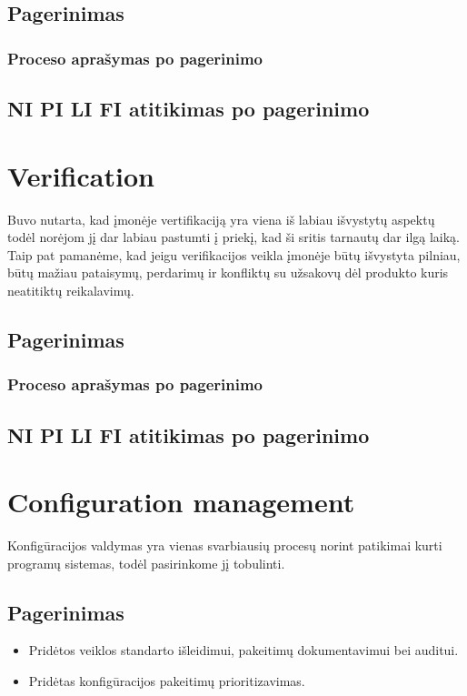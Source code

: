 \documentclass{VUMIFPSkursinis}
\begin{document}
		\subsection{Pagerinimas}
			\subsubsection{Proceso aprašymas po pagerinimo}
		\subsection{NI PI LI FI atitikimas po pagerinimo}
	\section{Verification}
		Buvo nutarta, kad įmonėje vertifikaciją yra viena iš labiau išvystytų aspektų todėl norėjom jį dar labiau pastumti į priekį, kad ši sritis tarnautų dar ilgą laiką. 
		Taip pat pamanėme, kad jeigu verifikacijos veikla įmonėje būtų išvystyta pilniau, būtų mažiau pataisymų, perdarimų ir konfliktų su užsakovų dėl produkto kuris neatitiktų reikalavimų.
		\subsection{Pagerinimas}
			\subsubsection{Proceso aprašymas po pagerinimo}
		\subsection{NI PI LI FI atitikimas po pagerinimo}
	\section{Configuration management}
	Konfigūracijos valdymas yra vienas svarbiausių procesų norint patikimai kurti programų sistemas, todėl pasirinkome jį tobulinti.
		\subsection{Pagerinimas}
		\begin{itemize}
			\item Pridėtos veiklos standarto išleidimui, pakeitimų dokumentavimui bei auditui.
			\item Pridėtas konfigūracijos pakeitimų prioritizavimas.
		\end{itemize}
\end{document}
